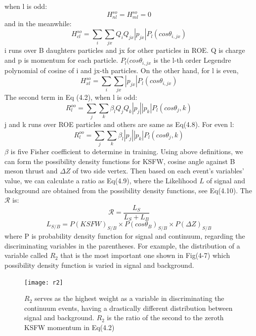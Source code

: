 when l is odd: 
\begin{equation}
	H_{nl}^{so}=H_{ml}^{so}=0
\end{equation}
and in the meanwhile: 
\begin{equation}
	H_{cl}^{so} = \sum_i \sum_{jx}Q_i Q_{jx}|p_{jx}|P_l(cos\theta_{i,jx})
\end{equation}
i runs over B daughters particles and jx for other particles in ROE. Q is charge and p is momentum for each particle. $P_l(cos\theta_{i,jx}$ is the l-th order Legendre polynomial of cosine of i and jx-th particles.
On the other hand, for l is even, 
\begin{equation}
	H_{xl}^{so}=\sum_i \sum_{jx}|p_{jx}|P_l(cos\theta_{i,jx})
\end{equation}
The second term in Eq (4.2), when l is odd: 
\begin{equation}
	R^{oo}_l = \sum_j \sum_k \beta_l Q_j Q_k |p_j||p_k|P_l(cos\theta_j,k)
\end{equation}
j and k runs over ROE particles and others are same as Eq(4.8).
For even l: 
\begin{equation}
	R^{oo}_l = \sum_j \sum_k \beta_l |p_j||p_k|P_l(cos\theta_j,k)
\end{equation}
$\beta$ is five Fisher coefficient to determine in training. 
Using above definitions, we can form the possibility density functions for KSFW, cosine angle against B meson thrust and $\Delta Z$ of two side vertex.  Then based on each event's variables' value, we can calculate a ratio as Eq(4.9), where the Likelihood $L$ of signal and background are obtained from the possibility density functions, see Eq(4.10).
The $ \mathcal{R} $ is: 
\begin{equation}
	\mathcal{R} = \frac{L_S}{L_S+L_B}
\end{equation}
\begin{equation}
L_{S/B} = P(KSFW)_{S/B} \times P(cos\theta_B)_{S/B} \times P(\Delta Z)_{S/B}
\end{equation}
where P is probability density function for signal and continuum, regarding the discriminating variables in the parentheses. For example, the distribution of a variable called $R_2$ that is the most important one shown in Fig(4-7) which possibility density function is varied in signal and background.

\begin{figure}[H]
	\centering
	\texttt{[image: r2]}
	\caption{$R_2$ serves as the highest weight as a variable in discriminating the continuum events, having a drastically different distribution between signal and background. $R_2$ is the ratio of the second to the zeroth KSFW momentum in Eq(4.2)}
\end{figure}




